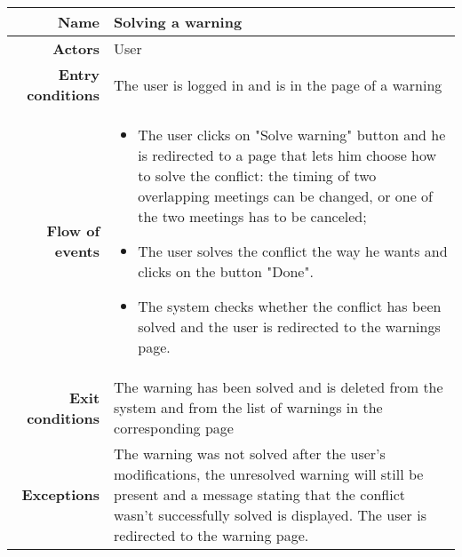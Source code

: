 \begin{center}
\begin{tabular}{r|p{7cm}}
\bf\large Name&\bf\large Solving a warning\\
\hline
\hline
\bf Actors&User\\
\hline
\bf Entry conditions&The user is logged in and is in the page of a warning\\
\hline
\bf Flow of events&
\begin{itemize}
\item The user clicks on "Solve warning" button and he is redirected to a page that lets him
choose how to solve the conflict: the timing of two overlapping meetings can be changed, or one of the two meetings has to be canceled; 
\item  The user solves the conflict the way he wants and clicks on the button "Done".
\item  The system checks whether the conflict has been solved and the user is redirected to the warnings page.
\end{itemize}
\\
\hline
\bf Exit conditions&The warning has been solved and is deleted from the system and from the list of warnings in the corresponding page\\
\hline
\bf Exceptions&The warning was not solved after the user's modifications, the unresolved warning will still be present and a message stating that the conflict wasn't successfully solved is displayed. The user is redirected to the warning page.
\\
\hline

\end{tabular}
\end{center}